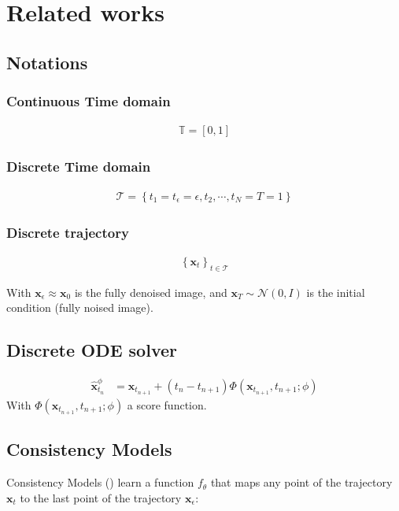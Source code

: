 \section{Related works}

\subsection{Notations}

\subsubsection{Continuous Time domain}
\begin{align}
  \mathbb{T} = [0, 1]
\end{align}

\subsubsection{Discrete Time domain}
\begin{align}
  \mathcal{T} = \left\{t_1 = t_\epsilon = \epsilon, t_2, \cdots, t_N = T = 1\right\}
\end{align}

\subsubsection{Discrete trajectory}
\begin{align}
  \left\{ \mathbf{x}_t \right\}_{t \in \mathcal{T}}
\end{align}

\noindent With $\mathbf{x}_{\epsilon} \approx \mathbf{x}_0$ is the fully denoised image, and $\mathbf{x}_T \sim \mathcal{N}(0, I)$ is the initial condition (fully noised image). \\

\subsection{Discrete ODE solver}
\begin{align}
    \widehat{\mathbf{x}}_{t_n}^{\phi} &= \mathbf{x}_{t_{n+1}} + (t_n  -t_{n+1}) \Phi(\mathbf{x}_{t_{n+1}}, t_{n+1}; \phi)
\end{align}
\noindent With $\Phi(\mathbf{x}_{t_{n+1}}, t_{n+1}; \phi)$ a score function.

\subsection{Consistency Models}
\noindent Consistency Models (\cite{song2023consistencymodels}) learn a function $f_{\theta}$ that maps any point of the trajectory $\mathbf{x}_t $ to the last point of the trajectory $\mathbf{x}_{\epsilon}$:

